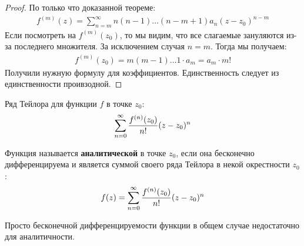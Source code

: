 \begin{proof}
    По только что доказанной теореме: 
    \begin{gather*}
        f^{(m)}(z) = \sum\limits_{n=m}^\infty n(n-1)\dots (n-m+1)a_n (z-z_0)^{n-m}
    \end{gather*}
    Если посмотреть на $f^{(m)}(z_0)$, то мы видим, что все слагаемые зануляются из-за последнего множителя. За исключением случая $n=m$. Тогда мы получаем:
    \begin{gather*}
        f^{(m)}(z_0) = m(m-1) \dots 1 \cdot a_m = a_m \cdot m!
    \end{gather*}
    Получили нужную формулу для коэффициентов. Единственность следует из единственности проивзодной.
\end{proof}
\begin{conj}
    Ряд Тейлора для функции $f$ в точке $z_0$:
    \begin{gather*}
        \sum\limits_{n=0}^\infty \frac{f^{(n)}(z_0)}{n!} (z - z_0)^n
    \end{gather*}
\end{conj}
\begin{conj}
    Функция называется \textbf{аналитической} в точке $z_0$, если она бесконечно 
    дифференцируема и является суммой своего ряда Тейлора в некой окрестности $z_0$:
    \begin{gather*}
       f(z) = \sum\limits_{n=0}^\infty \frac{f^{(n)}(z_0)}{n!} (z - z_0)^n 
    \end{gather*}
\end{conj}
\notice \; Просто бесконечной дифференцируемости функции в общем случае недостаточно для аналитичности.

